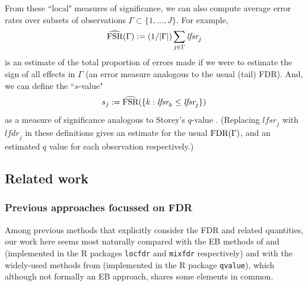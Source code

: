 \documentclass[11pt]{article}
\def\lfdr{\textit{lfdr}}
\def\lfsr{\textit{lfsr}}
\def\qvalue{{\tt qvalue}\xspace}
\def\locfdr{{\tt locfdr}\xspace}
\def\mixfdr{{\tt mixfdr}\xspace}
\begin{document}
From these ``local" measures of significance, we can also compute average error rates over subsets of observations
$\Gamma \subset \{1,\dots,J\}$. For example, 
\begin{equation} \label{eqn:FSRhat}
\widehat\FSR(\Gamma):= (1/|\Gamma|) \sum_{j \in \Gamma} \lfsr_j 
\end{equation}
is an estimate of the total proportion of errors made if we were to estimate the sign of all effects in $\Gamma$
(an error measure analogous to the usual (tail) FDR).
And, we can define the ``$s$-value" 
\begin{equation} \label{eqn:qvalue}
s_j := \widehat \FSR(\{k: \lfsr_k \leq \lfsr_j\}) 
\end{equation}
as a measure of significance analogous to Storey's $q$-value \cite{storey.03}.
(Replacing $\lfsr_j$ with $\lfdr_j$ in these definitions gives an estimate for the usual $\text{FDR}(\Gamma)$, and an estimated $q$ value for each observation respectively.)



\subsection*{Related work}

\subsubsection*{Previous approaches focussed on FDR}

Among previous methods that explicitly consider the FDR and related quantities,
our work here seems most naturally compared with the EB methods of \cite{efron2008microarrays} and \cite{muralidharan2010empirical}
 (implemented in the R packages \locfdr and \mixfdr respectively) and with the widely-used methods from  \cite{storey.03} (implemented in the R package \qvalue), which although not formally an EB approach, shares some elements in common.
\end{document}
